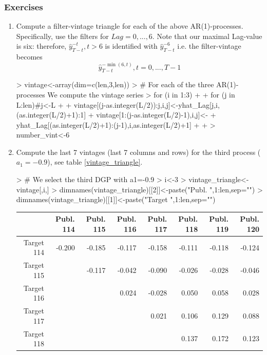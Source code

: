 \documentclass[a4paper]{book}
\begin{document}
\subsubsection{Exercises}
\begin{enumerate}
\item Compute a filter-vintage triangle for each of the above AR(1)-processes. Specifically, use the filters for $Lag=0,...,6$. Note that our maximal Lag-value is six: therefore,  $\hat{y}_{T-t}^{-t},t>6$ is identified with $\hat{y}_{T-t}^{-6}$ i.e. the filter-vintage becomes
\[\hat{y}_{T-t}^{-\min(6,t)}, t=0,...,T-1\]
\begin{Schunk}
\begin{Sinput}
> vintage<-array(dim=c(len,3,len))
> # For each of the three AR(1)-processes We compute the vintage series
> for (i in 1:3)
+ {
+   for (j in L:len)#j<-L
+   {
+     vintage[(j-as.integer(L/2)):j,i,j]<-yhat_Lag[j,i,(as.integer(L/2)+1):1]
+     vintage[1:(j-as.integer(L/2)-1),i,j]<-
+     yhat_Lag[(as.integer(L/2)+1):(j-1),i,as.integer(L/2)+1]
+   }
+ }
> number_vint<-6
\end{Sinput}
\end{Schunk}
\item Compute the last 7 vintages (last 7 columns and rows) for the third process ($a_1=-0.9$),  see table \ref{vintage_triangle}.
\begin{Schunk}
\begin{Sinput}
> # We select the third DGP with a1=-0.9
> i<-3
> vintage_triangle<-vintage[,i,]
> dimnames(vintage_triangle)[[2]]<-paste("Publ. ",1:len,sep="")
> dimnames(vintage_triangle)[[1]]<-paste("Target ",1:len,sep="")
\end{Sinput}
\end{Schunk}
\begin{table}[ht]
\centering
\begin{tabular}{rrrrrrrr}
  \hline
 & Publ. 114 & Publ. 115 & Publ. 116 & Publ. 117 & Publ. 118 & Publ. 119 & Publ. 120 \\ 
  \hline
Target 114 & -0.200 & -0.185 & -0.117 & -0.158 & -0.111 & -0.118 & -0.124 \\ 
  Target 115 &  & -0.117 & -0.042 & -0.090 & -0.026 & -0.028 & -0.046 \\ 
  Target 116 &  &  & 0.024 & -0.028 & 0.050 & 0.058 & 0.028 \\ 
  Target 117 &  &  &  & 0.021 & 0.106 & 0.129 & 0.088 \\ 
  Target 118 &  &  &  &  & 0.137 & 0.172 & 0.123 \\ 

\end{tabular}
\end{table}
\end{enumerate}
\end{document}
